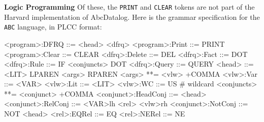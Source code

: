 \begin{minipage}[t]{\sw}
\slidenumber
\LARGE
{\bf Logic Programming}\exx
Of these, the \verb'PRINT' and \verb'CLEAR' tokens are not part
of the Harvard implementation of AbcDatalog.\exx
Here is the grammar specification for the \verb'ABC' language,
in PLCC format:
{\Large
\begin{qv}
<program>:DFRQ      ::= <head> <dfrq>
<program>:Print     ::= PRINT
<program>:Clear     ::= CLEAR
<dfrq>:Delete       ::= DEL
<dfrq>:Fact         ::= DOT
<dfrq>:Rule         ::= IF <conjuncts> DOT
<dfrq>:Query        ::= QUERY
<head>              ::= <LIT> LPAREN <args> RPAREN
<args>              **= <vlw> +COMMA
<vlw>:Var           ::= <VAR>
<vlw>:Lit           ::= <LIT>
<vlw>:WC            ::= US # wildcard
<conjuncts>         **= <conjunct> +COMMA
<conjunct>:HeadConj ::= <head>
<conjunct>:RelConj  ::= <VAR>lh <rel> <vlw>rh
<conjunct>:NotConj  ::= NOT <head>
<rel>:EQRel         ::= EQ
<rel>:NERel         ::= NE
\end{qv}
}
\end{minipage}
